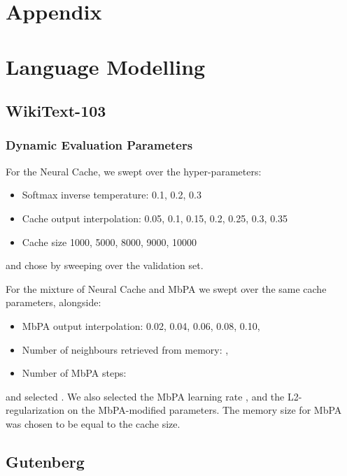\documentclass{article} \usepackage{hyperref}
\begin{document}
\newpage
\newpage

\appendix

\onecolumn

\section*{Appendix}

\section{Language Modelling}

\subsection{WikiText-103}
\label{appendix:wikitext}

\subsubsection{Dynamic Evaluation Parameters}
For the Neural Cache, we swept over the hyper-parameters:
\begin{itemize}
\item Softmax inverse temperature: 0.1, 0.2, 0.3
\item Cache output interpolation: 0.05, 0.1, 0.15, 0.2, 0.25, 0.3, 0.35
\item Cache size 1000, 5000, 8000, 9000, 10000
\end{itemize}
and chose  by sweeping over the validation set. 

For the mixture of Neural Cache and MbPA we swept over the same cache parameters, alongside:

\begin{itemize}
\item MbPA output interpolation: 0.02, 0.04, 0.06, 0.08, 0.10,
\item Number of neighbours retrieved from memory: ,
\item Number of MbPA steps: 
\end{itemize}

and selected . We also selected the MbPA learning rate , and the L2-regularization  on the MbPA-modified parameters. The memory size for MbPA was chosen to be equal to the cache size.


\subsection{Gutenberg}
\end{document}
